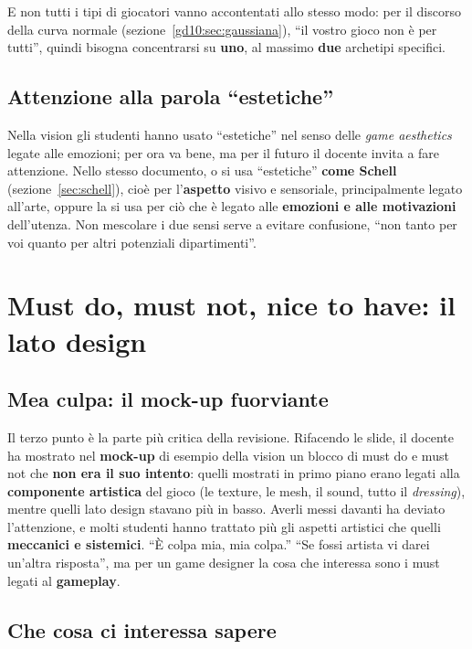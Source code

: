 E non tutti i tipi di giocatori vanno accontentati allo stesso modo: per il
discorso della curva normale (sezione~\ref{gd10:sec:gaussiana}), ``il
vostro gioco non è per tutti'', quindi bisogna concentrarsi su
\textbf{uno}, al massimo \textbf{due} archetipi specifici.

\subsection{Attenzione alla parola ``estetiche''}

Nella vision gli studenti hanno usato ``estetiche'' nel senso delle
\emph{game aesthetics} legate alle emozioni; per ora va bene, ma per il
futuro il docente invita a fare attenzione. Nello stesso documento, o si usa
``estetiche'' \textbf{come Schell} (sezione~\ref{sec:schell}), cioè per
l'\textbf{aspetto} visivo e sensoriale, principalmente legato all'arte,
oppure la si usa per ciò che è legato alle \textbf{emozioni e alle
motivazioni} dell'utenza. Non mescolare i due sensi serve a evitare
confusione, ``non tanto per voi quanto per altri potenziali dipartimenti''.

\section{Must do, must not, nice to have: il lato design}
\label{gd15:sec:must}

\subsection{Mea culpa: il mock-up fuorviante}

Il terzo punto è la parte più critica della revisione. Rifacendo le slide,
il docente ha mostrato nel \textbf{mock-up} di esempio della vision un blocco
di must do e must not che \textbf{non era il suo intento}: quelli mostrati in
primo piano erano legati alla \textbf{componente artistica} del gioco (le
texture, le mesh, il sound, tutto il \emph{dressing}), mentre quelli lato
design stavano più in basso. Averli messi davanti ha deviato l'attenzione,
e molti studenti hanno trattato più gli aspetti artistici che quelli
\textbf{meccanici e sistemici}. ``È colpa mia, mia colpa.'' ``Se fossi
artista vi darei un'altra risposta'', ma per un game designer la cosa che
interessa sono i must legati al \textbf{gameplay}.

\subsection{Che cosa ci interessa sapere}

